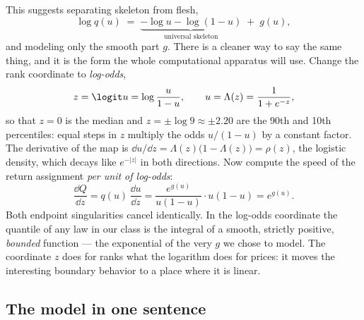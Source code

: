 This suggests separating skeleton from flesh,
\begin{equation}
\log q(u)\;=\;\underbrace{-\log u-\log(1-u)}_{\text{universal skeleton}}
\;+\;g(u),
\label{eq:skeleton}
\end{equation}
and modeling only the smooth part $g$.  There is a cleaner way to say the
same thing, and it is the form the whole computational apparatus will use.
Change the rank coordinate to \emph{log-odds},
\begin{equation}
z=\logit u=\log\frac{u}{1-u},
\qquad
u=\Lambda(z)=\frac{1}{1+e^{-z}},
\label{eq:logodds}
\end{equation}
so that $z=0$ is the median and $z=\pm\log 9\approx\pm2.20$ are the 90th
and 10th percentiles: equal steps in $z$ multiply the odds $u/(1-u)$ by a
constant factor.  The derivative of the map is
$\dd u/\dd z=\Lambda(z)\big(1-\Lambda(z)\big)=\rho(z)$, the logistic
density, which decays like $e^{-|z|}$ in both directions.  Now compute the
speed of the return assignment \emph{per unit of log-odds}:
\begin{equation}
\frac{\dd Q}{\dd z}
=q(u)\,\frac{\dd u}{\dd z}
=\frac{e^{g(u)}}{u(1-u)}\cdot u(1-u)
=e^{g(u)} .
\label{eq:speed}
\end{equation}
Both endpoint singularities cancel identically.  In the log-odds coordinate
the quantile of any law in our class is the integral of a smooth, strictly
positive, \emph{bounded} function --- the exponential of the very $g$ we
chose to model.  The coordinate $z$ does for ranks what the logarithm does
for prices: it moves the interesting boundary behavior to a place where it
is linear.

\subsection{The model in one sentence}

